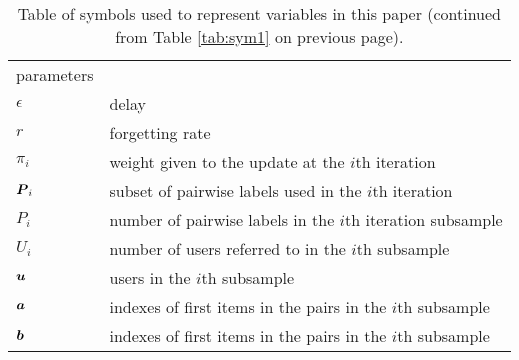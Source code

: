 \begin{table}
\begin{tabularx}{\columnwidth}{p{1.7cm} X }
 parameters \\
 $\epsilon$ & delay \\
 $r$ & forgetting rate \\
 $\pi_i$ & weight given to the update at the $i$th iteration \\
 $\boldsymbol P_i$ & subset of pairwise labels used in the $i$th iteration \\
 $P_i$ & number of pairwise labels in the $i$th iteration subsample \\
 $U_i$ & number of users referred to in the $i$th subsample \\
 $\boldsymbol u$ & users in the $i$th subsample \\
 $\boldsymbol a$ & indexes of first items in the pairs in the $i$th subsample \\
 $\boldsymbol b$ & indexes of first items in the pairs in the $i$th subsample \\
 \bottomrule
 \end{tabularx}
 \caption{Table of symbols used to represent variables in this paper (continued from Table \ref{tab:sym1} on previous page).}
 \label{tab:sym2}
\end{table}